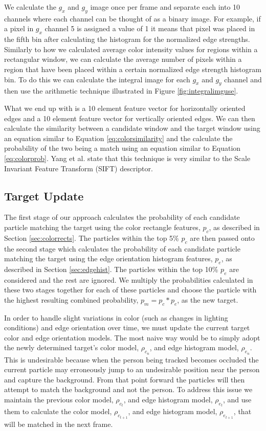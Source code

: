 \documentclass[12pt]{article}
\begin{document}
We calculate the $g_x$ and $g_y$ image once per frame and separate each into 10 channels where each channel can be thought of as a binary image. For example, if a pixel in $g_x$ channel 5 is assigned a value of 1 it means that pixel was placed in the fifth bin after calculating the histogram for the normalized edge strengths. Similarly to how we calculated average color intensity values for regions within a rectangular window, we can calculate the average number of pixels within a region that have been placed within a certain normalized edge strength histogram bin. To do this we can calculate the integral image for each $g_x$ and $g_y$ channel and then use the arithmetic technique illustrated in Figure \ref{fig:integralimguse}. 

What we end up with is a 10 element feature vector for horizontally oriented edges and a 10 element feature vector for vertically oriented edges. We can then calculate the similarity between a candidate window and the target window using an equation similar to Equation \ref{eq:colorsimilarity} and the calculate the probability of the two being a match using an equation similar to Equation \ref{eq:colorprob}. Yang et al. state that this technique is very similar to the Scale Invariant Feature Transform (SIFT) descriptor.


\subsection{Target Update}

The first stage of our approach calculates the probability of each candidate particle matching the target using the color rectangle features, $p_c$, as described in Section \ref{sec:colorrects}. The particles within the top 5\% $p_c$ are then passed onto the second stage which calculates the probability of each candidate particle matching the target using the edge orientation histogram features, $p_e$, as described in Section \ref{sec:edgehist}. The particles within the top 10\% $p_e$ are considered and the rest are ignored. We multiply the probabilities calculated in these two stages together for each of these particles and choose the particle with the highest resulting combined probability, $p_m = p_c * p_e$, as the new target.

In order to handle slight variations in color (such as changes in lighting conditions) and edge orientation over time, we must update the current target color and edge orientation models. The most naive way would be to simply adopt the newly determined target's color model, $\rho_{c_{n}}$, and edge histogram model, $\rho_{e_{n}}$. This is undesirable because when the person being tracked becomes occluded the current particle may erroneously jump to an undesirable position near the person and capture the background. From that point forward the particles will then attempt to match the background and not the person. To address this issue we maintain the previous color model, $\rho_{c_{t}}$, and edge histogram model, $\rho_{e_{t}}$, and use them to calculate the color model, $\rho_{c_{t+1}}$, and edge histogram model, $\rho_{e_{t+1}}$, that will be matched in the next frame.
\end{document}
